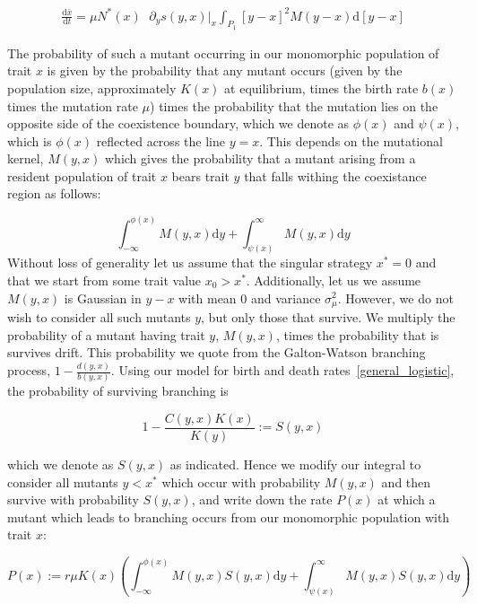 \documentclass[letterpaper,10pt]{article}
\newcommand{\ud}{\mathrm{d}}
\begin{document}
\begin{align}
\frac{\ud \bar x}{\ud t} = \mu N^*(x) \phantom \cdot \partial_y s(y,x) \Big|_x \int_{P_1} [y-x]^2 M(y-x) \ud [y-x]
\label{canonical}
\end{align}

The probability of such a mutant occurring in our monomorphic population of trait $x$ is given by the probability that any mutant occurs (given by the population size, approximately $K(x)$ at equilibrium, times the birth rate $b(x)$ times the mutation rate $\mu$) times the probability that the mutation lies on the opposite side of the coexistence boundary, which we denote as $\phi(x)$ and $\psi(x)$, which is $\phi(x)$ reflected across the line $y=x$.  This depends on the mutational kernel, $M(y,x)$ which gives the probability that a mutant arising from a resident population of trait $x$ bears trait $y$ that falls withing the coexistance region as follows:

\begin{equation*}
\int_{-\infty}^{\phi(x)} M(y,x) \ud y + \int_{\psi(x)}^{\infty} M(y,x) \ud y 
\end{equation*}
Without loss of generality let us assume that the singular strategy $x^* = 0$ and that we start from some trait value $x_0 > x^*$.  Additionally, let us we assume $M(y,x)$ is Gaussian in $y-x$ with mean 0 and variance $\sigma_{\mu}^2$. However, we do not wish to consider all such mutants $y$, but only those that survive.  We multiply the probability of a mutant having trait $y$, $M(y,x)$, times the probability that is survives drift.  This probability we quote from the Galton-Watson branching process, $1-\tfrac{d(y,x)}{b(y,x)}$. Using our model for birth and death rates~\eqref{general_logistic}, the probability of surviving branching is

\begin{equation}
1-\frac{C(y,x)K(x)}{K(y)} := S(y,x)
\label{S}
\end{equation}

which we denote as $S(y,x)$ as indicated. Hence we modify our integral to consider all mutants $y < x^*$ which occur with probability $M(y,x)$ and then survive with probability $S(y,x)$, and write down the rate $P(x)$ at which a mutant which leads to branching occurs from our monomorphic population with trait $x$:

\begin{equation}
P(x) := r \mu K(x)\left( \int_{-\infty}^{\phi(x)} M(y,x) S(y,x) \ud y + \int_{\psi(x)}^{\infty} M(y,x) S(y,x) \ud y  \right)
\label{MSerf}
\end{equation}
\end{document}
